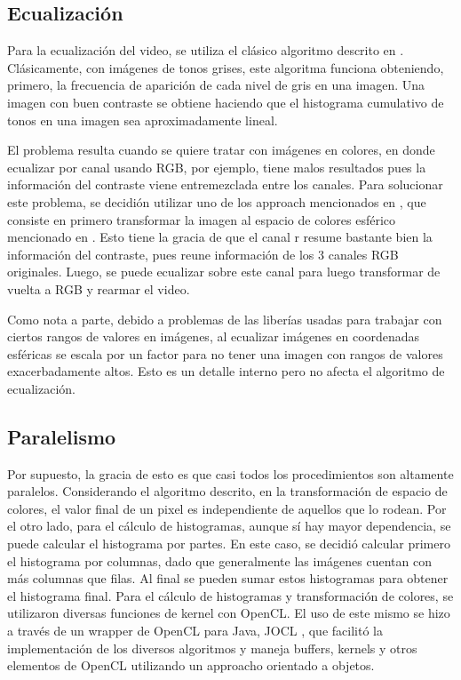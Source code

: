 \documentclass[12pt,spanish]{article}
\begin{document}
	\subsection{Ecualizaci\'on}
	Para la ecualizaci\'on del video, se utiliza el cl\'asico algoritmo descrito en \cite{equalization}. Cl\'asicamente, con im\'agenes de tonos grises, este algoritma funciona obteniendo, primero, la frecuencia de aparici\'on de cada nivel de gris en una imagen. Una imagen con buen contraste se obtiene haciendo que el histograma cumulativo de tonos en una imagen sea aproximadamente lineal. 

	El problema resulta cuando se quiere tratar con im\'agenes en colores, en donde ecualizar por canal usando RGB, por ejemplo, tiene malos resultados pues la informaci\'on del contraste viene entremezclada entre los canales. Para solucionar este problema, se decidi\'on utilizar uno de los approach mencionados en \cite{paper}, que consiste en primero transformar la imagen al espacio de colores esf\'erico mencionado en \cite{paper}. Esto tiene la gracia de que el canal r resume bastante bien la informaci\'on del contraste, pues reune informaci\'on de los 3 canales RGB originales. Luego, se puede ecualizar sobre este canal para luego transformar de vuelta a RGB y rearmar el video.

	Como nota a parte, debido a problemas de las liber\'ias usadas para trabajar con ciertos rangos de valores en im\'agenes, al ecualizar im\'agenes en coordenadas esf\'ericas se escala por un factor para no tener una imagen con rangos de valores exacerbadamente altos. Esto es un detalle interno pero no afecta el algoritmo de ecualizaci\'on.

	\subsection{Paralelismo}
	Por supuesto, la gracia de esto es que casi todos los procedimientos son altamente paralelos. Considerando el algoritmo descrito, en la transformaci\'on de espacio de colores, el valor final de un pixel es independiente de aquellos que lo rodean.
	Por el otro lado, para el c\'alculo de histogramas, aunque s\'i hay mayor dependencia, se puede calcular el histograma por partes. En este caso, se decidi\'o calcular primero el histograma por columnas, dado que generalmente las im\'agenes cuentan con m\'as columnas que filas. Al final se pueden sumar estos histogramas para obtener el histograma final.
	Para el c\'alculo de histogramas y transformaci\'on de colores, se utilizaron diversas funciones de kernel con OpenCL. El uso de este mismo se hizo a trav\'es de un wrapper de OpenCL para Java, JOCL \cite{JOCL}, que facilit\'o la implementaci\'on de los diversos algoritmos y maneja buffers, kernels y otros elementos de OpenCL utilizando un approacho orientado a objetos.	
\end{document}
